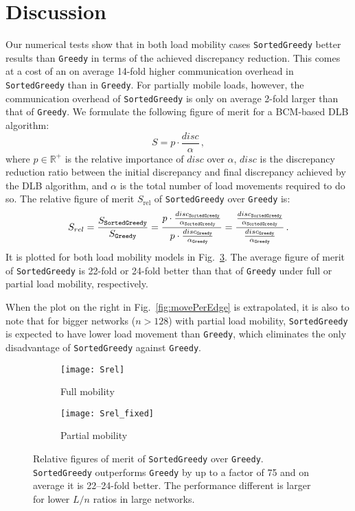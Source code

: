 \documentclass[12pt,psfig,a4]{article}
\newcommand{\sg}{\texttt{SortedGreedy}}
\newcommand{\gr}{\texttt{Greedy}}
\theoremstyle{plain}
\begin{document}
\section{Discussion}
\label{sec:discussion}
Our numerical tests show that in both load mobility cases \sg{} better results than \gr{} in terms of the achieved discrepancy reduction. This comes at a cost of an on average 14-fold higher communication overhead in \sg{} than in \gr{}. For partially mobile loads, however, the communication overhead of \sg{} is only on average 2-fold larger than that of \gr{}. We formulate the following figure of merit for a BCM-based DLB algorithm:
\begin{equation}
	S = p\cdot\frac{disc}{\alpha} \, , 
\end{equation}
where $p\in \mathbb{R}^+$ is the relative importance of $disc$ over $\alpha$, $disc$ is the discrepancy reduction ratio between the initial discrepancy and final discrepancy achieved by the DLB algorithm, and $\alpha$ is the total number of load movements required to do so. The relative figure of merit $S_{\text{rel}}$ of \sg{} over \gr{} is:
\begin{equation}
	S_{rel} = \frac{S_{\text{\sg{}}}}{S_{\text{\gr{}}}} = \frac{p\cdot\frac{disc_{\text{\sg{}}}}{\alpha_{\text{\sg{}}}}}{p\cdot\frac{disc_{\text{\gr{}}}}{\alpha_{\text{\gr{}}}}}=\frac{\frac{disc_{\text{\sg{}}}}{\alpha_{\text{\sg{}}}}}{\frac{disc_{\text{\gr{}}}}{\alpha_{\text{\gr{}}}}} \, . 
\end{equation}
It is plotted for both load mobility models in Fig.~\ref{fig:Srel}. The average figure of merit of \sg{} is 22-fold or 24-fold better than that of \gr{} under full or partial load mobility, respectively. 

When the plot on the right in Fig.~\ref{fig:movePerEdge} is extrapolated, it is also to note that for bigger networks ($n>128$) with partial load mobility, \sg{} is expected to have lower load movement than \gr{}, which eliminates the only disadvantage of \sg{} against \gr{}.
\begin{figure}
\centering	
	\begin{subfigure}[b]{0.44\textwidth}	
		\centering
	      	\texttt{[image: Srel]}
		\caption{Full mobility}
		\label{fig:Srel1}
	\end{subfigure}
	\begin{subfigure}[b]{0.44\textwidth}	
		\centering
	      	\texttt{[image: Srel\_fixed]}
		\caption{Partial mobility}
		\label{fig:Srel2}
	\end{subfigure}
	\caption{Relative figures of merit of \sg{} over \gr{}. \sg{} outperforms \gr{} by up to a factor of 75 and on average it is 22--24-fold better. The performance different is larger for lower $L/n$ ratios in large networks. } 
	\label{fig:Srel}
\end{figure}
\end{document}

